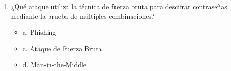 \documentclass[a4paper]{article}
\begin{document}
\begin{enumerate}
    \item ¿Qué ataque utiliza la técnica de fuerza bruta para descifrar contraseñas mediante la prueba de múltiples combinaciones?
    \begin{itemize}
        \item a. Phishing
        \item c. Ataque de Fuerza Bruta
        \item d. Man-in-the-Middle
    \end{itemize}


\end{enumerate}
\end{document}
